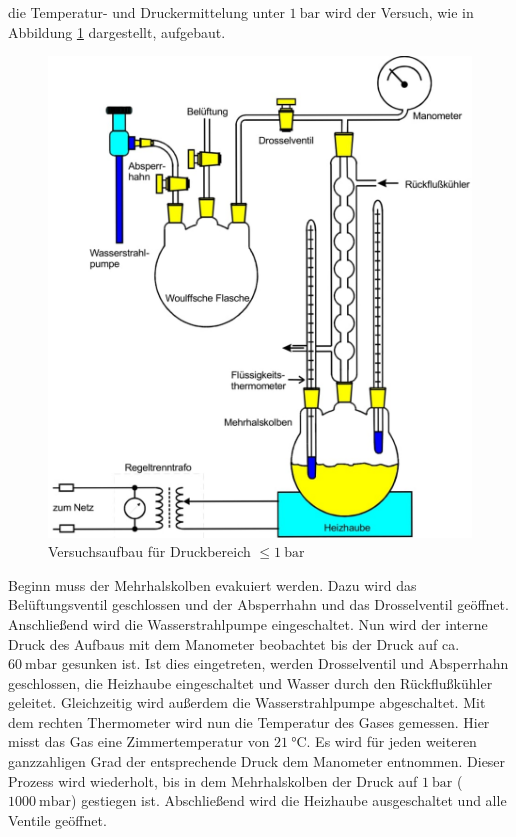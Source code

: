 \justifying die Temperatur- und Druckermittelung unter $\SI{1}{\bar}$ wird der Versuch, wie in Abbildung \ref{fig:2} dargestellt,
aufgebaut.

\begin{figure}
    \centering
    \includegraphics[width=0.75\linewidth]{./images/k1bar.jpg}
    \caption{Versuchsaufbau für Druckbereich $\leq \SI{1}{\bar}$ \cite{V203}}
    \label{fig:2}
\end{figure}
\newpage

\justifying Beginn muss der Mehrhalskolben evakuiert werden. Dazu wird das Belüftungsventil geschlossen und der Absperrhahn und
das Drosselventil geöffnet. Anschließend wird die Wasserstrahlpumpe eingeschaltet. Nun wird der interne Druck des Aufbaus mit dem Manometer
beobachtet bis der Druck auf ca. $\SI{60}{\milli\bar}$ gesunken ist. Ist dies eingetreten, werden Drosselventil und Absperrhahn geschlossen, die Heizhaube
eingeschaltet und Wasser durch den Rückflußkühler geleitet. Gleichzeitig wird außerdem die Wasserstrahlpumpe abgeschaltet. Mit dem rechten
Thermometer wird nun die Temperatur des Gases gemessen. Hier misst das Gas eine Zimmertemperatur von $\SI{21}{\celsius}$. Es wird für jeden 
weiteren ganzzahligen Grad der entsprechende Druck dem Manometer entnommen. Dieser Prozess wird wiederholt, bis in dem Mehrhalskolben der Druck 
auf $\SI{1}{\bar}$ ($\SI{1000}{\milli\bar}$) gestiegen ist. Abschließend wird die Heizhaube ausgeschaltet und alle Ventile geöffnet.  

